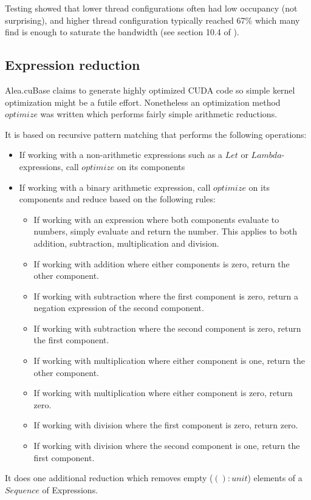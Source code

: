 Testing showed that lower thread configurations often had low occupancy (not surprising), and higher thread configuration typically reached 67\% which many find is enough to saturate the bandwidth (see section 10.4 of \cite{cudacoccupancy}).

\subsection{Expression reduction}\label{subsec:exprReduction}
Alea.cuBase claims to generate highly optimized CUDA code so simple kernel optimization might be a futile effort.
Nonetheless an optimization method $optimize$ was written which performs fairly simple arithmetic reductions.

It is based on recursive pattern matching that performs the following operations:
\begin{itemize}
\item If working with a non-arithmetic expressions such as a $Let$ or $Lambda$-expressions, call $optimize$ on its components
\item If working with a binary arithmetic expression, call $optimize$ on its components and reduce based on the following rules:
	\begin{itemize}
	\item If working with an expression where both components evaluate to numbers, simply evaluate and return the number. This applies to both addition, subtraction, multiplication and division.
	\item If working with addition where either components is zero, return the other component.
	\item If working with subtraction where the first component is zero, return a negation expression of the second component.
	\item If working with subtraction where the second component is zero, return the first component.
	\item If working with multiplication where either component is one, return the other component.
	\item If working with multiplication where either component is zero, return zero.
	\item If working with division where the first component is zero, return zero.
	\item If working with division where the second component is one, return the first component.
	\end{itemize}
\end{itemize}
It does one additional reduction which removes empty ($() : unit$) elements of a $Sequence$ of Expressions.


